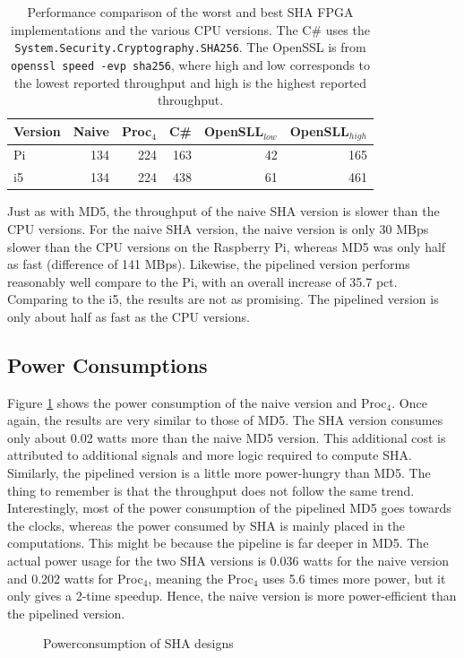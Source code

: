 \documentclass[a4paper, openany]{book}
\begin{document}
\begin{table}[!htb]
\centering
\captionsetup{width=.8\linewidth}
\begin{tabular}{l r r r r r}
\hline
\textbf{Version} & Naive & Proc$_{4}$ & C\# & OpenSLL$_{low}$ & OpenSLL$_{high}$\\
\hline
Pi & 134 & 224 & 163 & 42 & 165\\
i5 & 134 & 224 & 438 & 61 & 461
\end{tabular}
\caption[SHA256: FPGA and CPU comparisons]%
{Performance comparison of the worst and best SHA FPGA implementations and the various CPU versions. The C\# uses the \texttt{System.Security.Cryptography.SHA256}. The OpenSSL is from \texttt{openssl speed -evp sha256}, where high and low corresponds to the lowest reported throughput and high is the highest reported throughput.}
\label{tab:SHAcompare}
\end{table}
Just as with MD5, the throughput of the naive SHA version is slower than the CPU versions. For the naive SHA version, the naive version is only 30 MBps slower than the CPU versions on the Raspberry Pi, whereas MD5 was only half as fast (difference of 141 MBps). Likewise, the pipelined version performs reasonably well compare to the Pi, with an overall increase of 35.7 pct. Comparing to the i5, the results are not as promising. The pipelined version is only about half as fast as the CPU versions.
\subsection{Power Consumptions}
\label{sec:org27f1310}
Figure \ref{fig:SHA_power} shows the power consumption of the naive version and Proc\(_4\). Once again, the results are very similar to those of MD5. The SHA version consumes only about 0.02 watts more than the naive MD5 version. This additional cost is attributed to additional signals and more logic required to compute SHA. Similarly, the pipelined version is a little more power-hungry than MD5. The thing to remember is that the throughput does not follow the same trend.
Interestingly, most of the power consumption of the pipelined MD5 goes towards the clocks, whereas the power consumed by SHA is mainly placed in the computations. This might be because the pipeline is far deeper in MD5. The actual power usage for the two SHA versions is 0.036 watts for the naive version and 0.202 watts for Proc\(_4\), meaning the Proc\(_4\) uses 5.6 times more power, but it only gives a 2-time speedup. Hence, the naive version is more power-efficient than the pipelined version.
\begin{figure}[H]
\centering
{}
\caption[Power consumption of SHA256 designs]
{Powerconsumption of SHA designs}
\label{fig:SHA_power}
\end{figure}
\end{document}

